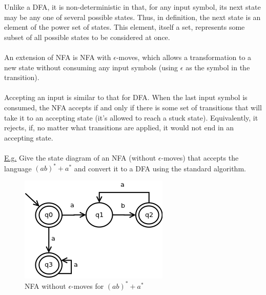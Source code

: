 \documentclass[8pt,letterpaper,twocolumn]{article}
\begin{document}
Unlike a DFA, it is non-deterministic in that, for any input symbol,
its next state may be any one of several possible states.
Thus, in definition, the next state is an element of the power set of states.
This element, itself a set, represents some subset of all possible states to be considered at once.\\
\\
An extension of NFA is NFA with $\epsilon$-moves, which allows a transformation to a new state
without consuming any input symbols (using $\epsilon$ as the symbol in the transition).\\
\\
Accepting an input is similar to that for DFA.
When the last input symbol is consumed, the NFA accepts if and only if there is some set of
transitions that will take it to an accepting state (it's allowed to reach a stuck state).
Equivalently, it rejects, if, no matter what transitions are applied,
it would not end in an accepting state.\\
\\
\underline{E.g.} Give the state diagram of an NFA (without $\epsilon$-moves)
that accepts the language $(ab)^* + a^*$ and convert it to a DFA using the standard algorithm.

\begin{figure}[h!]
  \centering
    \includegraphics[scale=0.5]{nfa.png}
  \caption{NFA without $\epsilon$-moves for $(ab)^*+a^*$}
  \label{NFA}
\end{figure}
  
\end{document}
